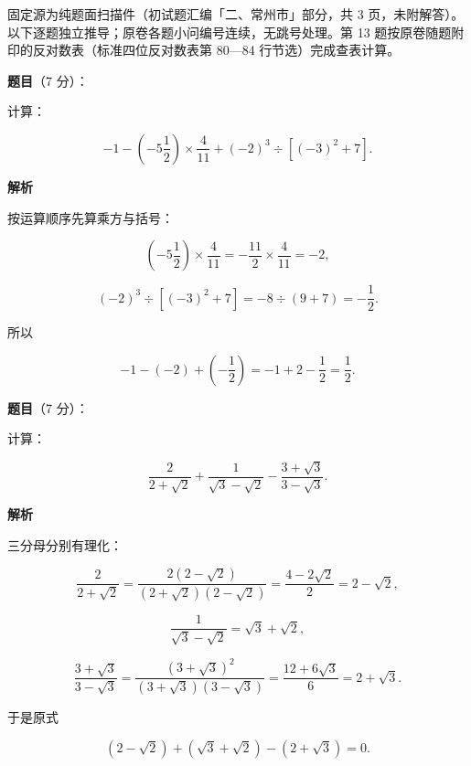 

\begin{gktip}
固定源为纯题面扫描件（初试题汇编「二、常州市」部分，共 3 页，未附解答）。以下逐题独立推导；原卷各题小问编号连续，无跳号处理。第 13 题按原卷随题附印的反对数表（标准四位反对数表第 80—84 行节选）完成查表计算。
\end{gktip}

\begin{answer}

\textbf{题目}（7 分）：

计算：

\nopagebreak[4]
\[
-1-\left(-5\frac{1}{2}\right)\times\frac{4}{11}+(-2)^3\div\left[(-3)^2+7\right].
\]

\textbf{解析}

按运算顺序先算乘方与括号：

\nopagebreak[4]
\[
\left(-5\frac{1}{2}\right)\times\frac{4}{11}=-\frac{11}{2}\times\frac{4}{11}=-2,
\]

\nopagebreak[4]
\[
(-2)^3\div\left[(-3)^2+7\right]=-8\div(9+7)=-\frac{1}{2}.
\]

所以

\nopagebreak[4]
\[
-1-(-2)+\left(-\frac{1}{2}\right)=-1+2-\frac{1}{2}=\frac{1}{2}.
\]


\end{answer}
\begin{answer}

\textbf{题目}（7 分）：

计算：

\nopagebreak[4]
\[
\frac{2}{2+\sqrt{2}}+\frac{1}{\sqrt{3}-\sqrt{2}}-\frac{3+\sqrt{3}}{3-\sqrt{3}}.
\]

\textbf{解析}

三分母分别有理化：

\nopagebreak[4]
\[
\frac{2}{2+\sqrt{2}}=\frac{2(2-\sqrt{2})}{(2+\sqrt{2})(2-\sqrt{2})}=\frac{4-2\sqrt{2}}{2}=2-\sqrt{2},
\]

\nopagebreak[4]
\[
\frac{1}{\sqrt{3}-\sqrt{2}}=\sqrt{3}+\sqrt{2},
\]

\nopagebreak[4]
\[
\frac{3+\sqrt{3}}{3-\sqrt{3}}=\frac{(3+\sqrt{3})^2}{(3+\sqrt{3})(3-\sqrt{3})}=\frac{12+6\sqrt{3}}{6}=2+\sqrt{3}.
\]

于是原式

\nopagebreak[4]
\[
(2-\sqrt{2})+(\sqrt{3}+\sqrt{2})-(2+\sqrt{3})=0.
\]


\end{answer}
